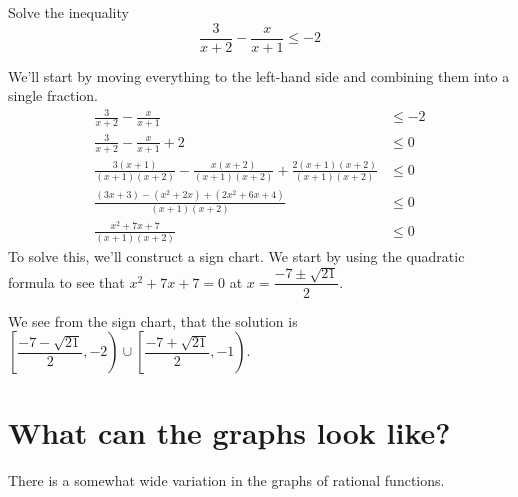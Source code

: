 \documentclass{ximera}
\begin{document}
\begin{example}
	Solve the inequality
	\[ \frac{3}{x+2} - \frac{x}{x+1} \leq -2 \]
	\begin{explanation}
		We'll start by moving everything to the left-hand side and combining them into a single fraction.
		\begin{align*}
			\frac{3}{x+2} - \frac{x}{x+1} &\leq -2\\
			\frac{3}{x+2} - \frac{x}{x+1} + 2 &\leq 0\\
			\frac{3(x+1)}{(x+1)(x+2)} - \frac{x(x+2)}{(x+1)(x+2)} + \frac{2(x+1)(x+2)}{(x+1)(x+2)} &\leq 0\\
			\frac{(3x+3) - (x^2+2x) + (2x^2+6x+4)}{(x+1)(x+2)} &\leq 0\\
			\frac{x^2+7x+7}{(x+1)(x+2)} &\leq 0
		\end{align*}
		To solve this, we'll construct a sign chart.  We start by using the quadratic formula to see that $x^2 + 7x + 7 = 0$ at $x= \dfrac{-7 \pm \sqrt{21}}{2}$.
		
		We see from the sign chart, that the solution is $\displaystyle \left[ \dfrac{-7-\sqrt{21}}{2} , -2\right)\cup \left[ \dfrac{-7+\sqrt{21}}{2}, -1 \right)$.
	\end{explanation}
\end{example}







\section{What can the graphs look like?}

There is a somewhat wide variation in the graphs of rational
functions.
\end{document}
